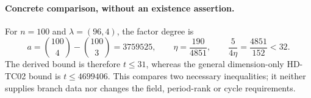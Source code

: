 \paragraph{Concrete comparison, without an existence assertion.}
For $n=100$ and $\lambda=(96,4)$, the factor degree is
\[
 a=\binom{100}{4}-\binom{100}{3}=3759525,
 \qquad \eta=\frac{190}{4851},
 \qquad \frac5{4\eta}=\frac{4851}{152}<32.
 \tag{TCL.4}
\]
The derived bound is therefore $t\le31$, whereas the general
dimension-only HD-TC02 bound is $t\le4699406$.
This compares two necessary inequalities; it neither supplies
branch data nor changes the field, period-rank or cycle requirements.

